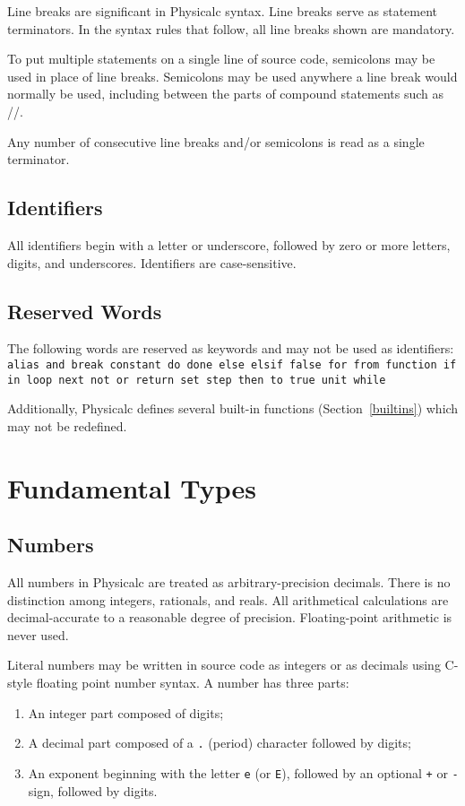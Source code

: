 Line breaks are significant in Physicalc syntax.  Line breaks serve as
statement terminators.  In the syntax rules that follow, all line
breaks shown are mandatory.

To put multiple statements on a single line of source code, semicolons
may be used in place of line breaks.  Semicolons may be used anywhere
a line break would normally be used, including between the parts of
compound statements such as //.

Any number of consecutive line breaks and/or semicolons is read as a
single terminator.


\subsection{Identifiers}

All identifiers begin with a letter or underscore, followed by zero or
more letters, digits, and underscores.  Identifiers are case-sensitive.


\subsection{Reserved Words}

The following words are reserved as keywords and may not be used as
identifiers:
{\tt
alias
and
break
constant
do
done
else
elsif
false
for
from
function
if
in
loop
next
not
or
return
set
step
then
to
true
unit
while
}

Additionally, Physicalc defines several built-in functions
(Section~\ref{builtins}) which may not be redefined.



\section{Fundamental Types}
\label{types}

\subsection{Numbers}
\label{numbers}

All numbers in Physicalc are treated as arbitrary-precision decimals.
There is no distinction among integers, rationals, and reals.  All
arithmetical calculations are decimal-accurate to a reasonable
degree of precision.  Floating-point arithmetic is never used.

Literal numbers may be written in source code as integers or as
decimals using C-style floating point number syntax.  A number has
three parts:
\begin{enumerate}
\item An integer part composed of digits;
\item A decimal part composed of a \verb+.+ (period) character
  followed by digits;
\item An exponent beginning with the letter \verb+e+ (or \verb+E+),
  followed by an optional \verb|+| or \verb|-| sign, followed by
  digits.
\end{enumerate}

